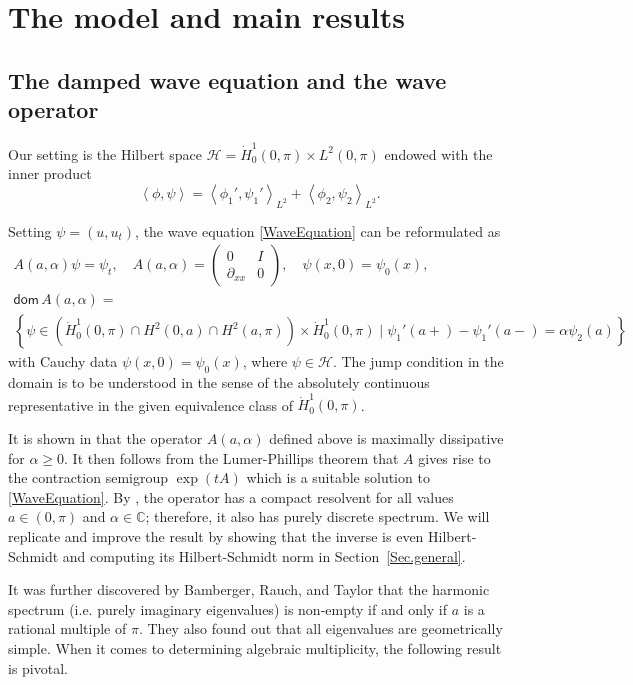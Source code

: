 \documentclass[11pt, a4paper,reqno]{amsart}
\theoremstyle{plain}
\theoremstyle{definition}
\theoremstyle{remark}
\newcommand{\inner}[2]{\left\langle{#1}, {#2}\right\rangle}
\newcommand{\1}{\mathds 1}
\newcommand{\Dom}{\mathsf{dom}\,}
\begin{document}
\section{The model and main results}\label{Sec.results}
%

\subsection{The damped wave equation and the wave operator}
%
Our setting is the Hilbert space $\mathcal H = \dot H_0^1(0, \pi) \times L^2(0, \pi)$ endowed with the inner product
\[
\inner{\phi}{\psi} = \inner{\phi_1'}{\psi_1'}_{L^2} + \inner{\phi_2}{\psi_2}_{L^2}.
\]

Setting $\psi = (u, u_t)$, the wave equation \eqref{WaveEquation} can be reformulated as
\begin{gather}
A(a, \alpha)\psi = \psi_t, \quad A(a,\alpha) = \begin{pmatrix} 0 & I \nonumber \\ \partial_{xx} & 0 \end{pmatrix}, \quad \psi(x, 0) = \psi_0(x), \\ \Dom A(a,\alpha) =\nonumber \\ \left\{\psi \in \left(\dot H_0^1(0, \pi) \cap H^2(0, a) \cap H^2(a, \pi)\right) \times \dot H_0^1(0, \pi) \mid \psi_1'(a+) - \psi_1'(a-) = \alpha\psi_2(a) \right\}
\label{DefinitionOfA}
\end{gather}
with Cauchy data $\psi(x, 0) = \psi_0(x)$, where $\psi \in \mathcal H$. The jump condition in the domain is to be understood in the sense of the absolutely continuous representative in the given equivalence class of $\dot H_0^1(0, \pi)$.

It is shown in \cite{BRT} that the operator $A(a, \alpha)$ defined above is maximally dissipative for $\alpha \geq 0$. It then follows from the Lumer-Phillips theorem \cite[Theorem 4.3]{Pazy} that $A$ gives rise to the contraction semigroup $\exp(tA)$ which is a suitable solution to \eqref{WaveEquation}.
By \cite{BRT}, the operator has a compact resolvent for all values $a \in (0, \pi)$ and $\alpha \in \mathbb C$; therefore, it also has purely discrete spectrum. We will replicate and improve the result by showing that the inverse is even Hilbert-Schmidt and computing its Hilbert-Schmidt norm in Section~\ref{Sec.general}.

It was further discovered by Bamberger, Rauch, and Taylor that the harmonic spectrum (i.e. purely imaginary eigenvalues) is non-empty if and only if $a$ is a rational multiple of $\pi$. They also found out that all eigenvalues are geometrically simple. When it comes to determining algebraic multiplicity, the following result is pivotal.
\end{document}
